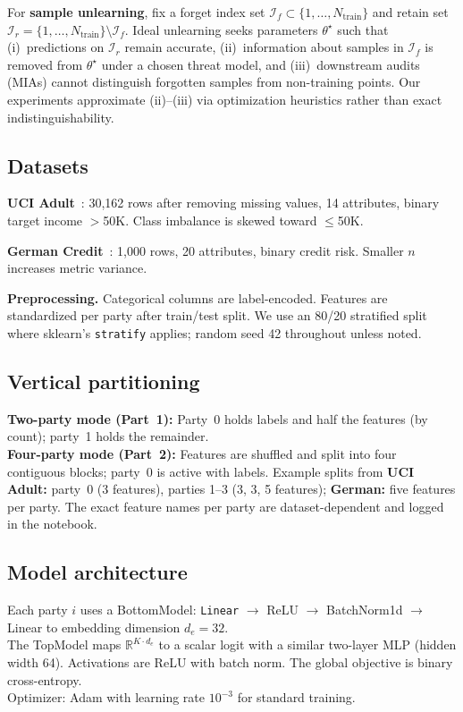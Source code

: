 \documentclass[sigconf,nonacm]{acmart}
\begin{document}
For \textbf{sample unlearning}, fix a forget index set $\mathcal{I}_f\subset\{1,\ldots,N_{\mathrm{train}}\}$ and retain set $\mathcal{I}_r = \{1,\ldots,N_{\mathrm{train}}\}\setminus \mathcal{I}_f$. Ideal unlearning seeks parameters $\theta^\star$ such that (i)~predictions on $\mathcal{I}_r$ remain accurate, (ii)~information about samples in $\mathcal{I}_f$ is removed from $\theta^\star$ under a chosen threat model, and (iii)~downstream audits (MIAs) cannot distinguish forgotten samples from non-training points. Our experiments approximate (ii)--(iii) via optimization heuristics rather than exact indistinguishability.

\subsection{Datasets}
\textbf{UCI Adult}~\cite{kohavi1996adult}: 30{,}162 rows after removing missing values, 14 attributes, binary target income $>$50K. Class imbalance is skewed toward $\leq$50K.

\textbf{German Credit}~\cite{hofmann1994german}: 1{,}000 rows, 20 attributes, binary credit risk. Smaller $n$ increases metric variance.

\textbf{Preprocessing.} Categorical columns are label-encoded. Features are standardized per party after train/test split. We use an 80/20 stratified split where sklearn's \texttt{stratify} applies; random seed 42 throughout unless noted.

\subsection{Vertical partitioning}
\textbf{Two-party mode (Part~1):} Party~0 holds labels and half the features (by count); party~1 holds the remainder.\\ \textbf{Four-party mode (Part~2):} Features are shuffled and split into four contiguous blocks; party~0 is active with labels. Example splits from \textbf{UCI Adult:} party~0 (3 features), parties 1--3 (3, 3, 5 features); \textbf{German:} five features per party. The exact feature names per party are dataset-dependent and logged in the notebook.

\subsection{Model architecture}
Each party $i$ uses a BottomModel: \texttt{Linear} $\to$ ReLU $\to$ BatchNorm1d $\to$ Linear to embedding dimension $d_e{=}32$.\\
The TopModel maps $\mathbb{R}^{K\cdot d_e}$ to a scalar logit with a similar two-layer MLP (hidden width 64). Activations are ReLU with batch norm. The global objective is binary cross-entropy.\\
Optimizer: Adam with learning rate $10^{-3}$ for standard training.
\end{document}
